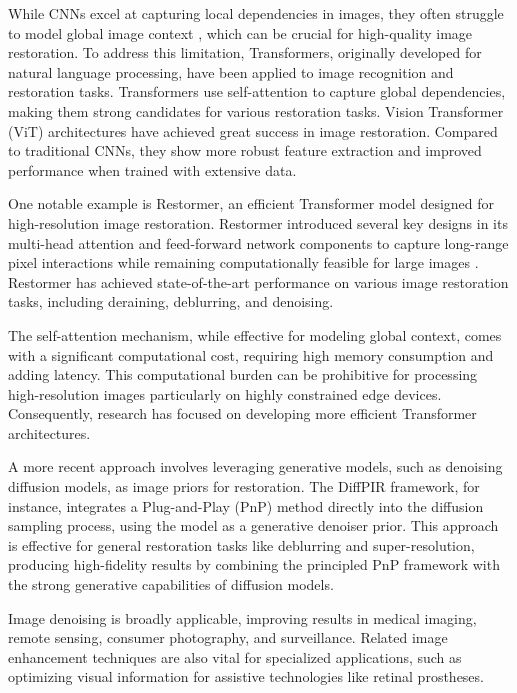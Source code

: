 While CNNs excel at capturing local dependencies in images, they often struggle to model global image context \cite{Ma2022, Chen2022}, which can be crucial for high-quality image restoration. To address this limitation, Transformers, originally developed for natural language processing\cite{vaswani2023}, have been applied to image recognition \cite{dosovitskiy2021} and restoration \cite{chen2021} tasks. Transformers use self-attention to capture global dependencies, making them strong candidates for various restoration tasks. Vision Transformer (ViT) architectures have achieved great success in image restoration. Compared to traditional CNNs, they show more robust feature extraction and improved performance when trained with extensive data\cite{Ali2023}.

One notable example is Restormer\cite{Zamir2022}, an efficient Transformer model designed for high-resolution image restoration. Restormer introduced several key designs in its multi-head attention and feed-forward network components to capture long-range pixel interactions while remaining computationally feasible for large images \cite{Ma20222, Ma2024, Ma2023}. Restormer has achieved state-of-the-art performance on various image restoration tasks, including deraining, deblurring, and denoising\cite{Zamir2022}.

The self-attention mechanism, while effective for modeling global context, comes with a significant computational cost, requiring high memory consumption and adding latency. This computational burden can be prohibitive for processing high-resolution images 
particularly on highly constrained edge devices. Consequently, research has focused on developing more efficient Transformer architectures.

A more recent approach involves leveraging generative models, such as denoising diffusion models, as image priors for restoration. The DiffPIR framework, for instance, integrates a Plug-and-Play (PnP) method directly into the diffusion sampling process, using the model as a generative denoiser prior. This approach is effective for general restoration tasks like deblurring and super-resolution, producing high-fidelity results by combining the principled PnP framework with the strong generative capabilities of diffusion models\cite{zhu2023}.

Image denoising is broadly applicable, improving results in medical imaging, remote sensing, consumer photography, and surveillance. Related image enhancement techniques are also vital for specialized applications, such as optimizing visual information for assistive technologies like retinal prostheses\cite{AlAtabany2011}.

